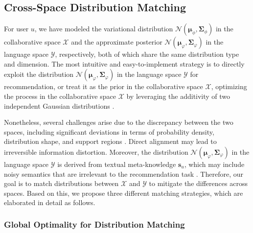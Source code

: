\documentclass[sigconf]{acmart}
\begin{document}
\subsection{Cross-Space Distribution Matching}

For user $u$,  we have modeled the variational distribution $\mathcal N(\boldsymbol{\mu}_{\phi}, \boldsymbol{\Sigma}_{\phi})$ in the collaborative space $\mathcal X$ and the approximate posterior $\mathcal N(\boldsymbol{\mu}_{\varphi}, \boldsymbol{\Sigma}_{\varphi})$ in the language space $\mathcal Y$, respectively, both of which share the same distribution type and dimension. The most intuitive and easy-to-implement strategy is to directly exploit the distribution $\mathcal N(\boldsymbol{\mu}_{\varphi}, \boldsymbol{\Sigma}_{\varphi})$ in the language space $\mathcal Y$ for recommendation, or treat it as the prior in the collaborative space $\mathcal X$, optimizing the process in the collaborative space $\mathcal X$ by leveraging the additivity of two independent Gaussian distributions \cite{luo2022understanding, wang2023diffusion}.

Nonetheless, several challenges arise due to the discrepancy between the two spaces, including significant deviations in terms of probability density, distribution shape, and support regions \cite{xu2020learning}. Direct alignment may lead to irreversible  information distortion. Moreover, the distribution $\mathcal N(\boldsymbol{\mu}_{\varphi}, \boldsymbol{\Sigma}_{\varphi})$ in the language space $\mathcal Y$ is derived from textual meta-knowledge $\mathbf s_u$, which may include noisy semantics that are irrelevant to the recommendation task \cite{ren2024representation}. Therefore, our goal is to match distributions between $\mathcal X$ and $\mathcal Y$ to mitigate the differences across spaces. Based on this, we propose three different matching strategies, which are elaborated in detail as follows.

\subsubsection{\textbf{Global Optimality for Distribution Matching}}
\end{document}
